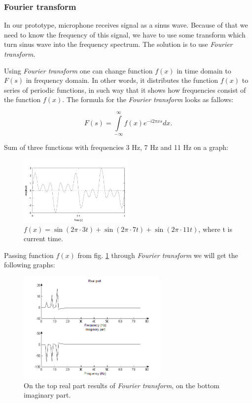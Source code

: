 \documentclass[11pt,titlepage]{article}
\theoremstyle{plain}
\begin{document}
\subsubsection{Fourier transform}
In our prototype, microphone receives signal as a sinus wave. Because of that we need to know the frequency of this signal, we have to use some transform which turn sinus wave into the frequency spectrum. The solution is to use \textit{Fourier transform}.

\vspace{5mm}

Using \textit{Fourier transform} one can change function $f(x)$ in time domain to $F(s)$ in frequency domain. In other words, it distributes the function $f(x)$ to series of periodic functions, in such way that it shows how frequencies consist of the function $f(x)$. The formula for the \textit{Fourier transform} looks as fallows:

\begin{equation}
	F(s) = \int\limits^\infty_{-\infty} f(x) e^{-i2\pi xs} dx.
\end{equation}

Sum of three functions with frequencies 3 Hz, 7 Hz and 11 Hz on a graph:
\begin{figure}[H]
	\centering
	\includegraphics[width=0.5\textwidth]{img/sines}
	\caption{$f(x) = \sin(2\pi \cdot 3t)+\sin(2 \pi \cdot 7 t)+\sin(2  \pi \cdot 11  t)$, where t is current time.}
	\label{fig:F4}
\end{figure}

Passing function $f(x)$ from fig. \ref{fig:F4} through \textit{Fourier transform} we will get the following graphs:

\begin{figure}[H]
	\centering
	\includegraphics[width=0.65\textwidth]{img/both_real_imag}
	\caption{On the top real part results of \textit{Fourier transform}, on the bottom imaginary part.}
	\label{fig:F5}
\end{figure}
\end{document}
